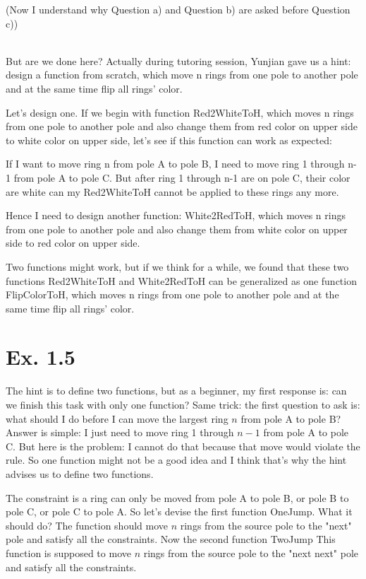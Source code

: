 \documentclass[a4paper,11pt]{article}
\theoremstyle{mytheor}
\begin{document}
(Now I understand why Question a) and Question b) are asked before Question c))

~\\
But are we done here? Actually during tutoring session, Yunjian gave us a hint: design a function from scratch, which move n rings from one pole to another pole and at the same time flip all rings' color.

Let's design one. If we begin with function Red2WhiteToH, which moves n rings from one pole to another pole and also change them from red color on upper side to white color on upper side, let's see if this function can work as expected:

If I want to move ring n from pole A to pole B, I need to move ring 1 through n-1 from pole A to pole C. But after ring 1 through n-1 are on pole C, their color are white can my Red2WhiteToH cannot be applied to these rings any more.

Hence I need to design another function: White2RedToH, which moves n rings from one pole to another pole and also change them from white color on upper side to red color on upper side.

Two functions might work, but if we think for a while, we found that these two functions Red2WhiteToH and White2RedToH can be generalized as one function FlipColorToH, which moves n rings from one pole to another pole and at the same time flip all rings' color.




\vspace{1.2in}

\section*{Ex. 1.5}
The hint is to define two functions, but as a beginner, my first response is: can we finish this task with only one function?
Same trick: the first question to ask is: what should I do before I can move the largest ring $n$ from pole A to pole B? Answer is simple: I just need to move ring 1 through $n-1$ from pole A to pole C. But here is the problem: I cannot do that because that move would violate the rule. So one function might not be a good idea and I think that's why the hint advises us to define two functions.

The constraint is a ring can only be moved from pole A to pole B, or pole B to pole C, or pole C to pole A.
So let's devise the first function OneJump. What it should do? The function should move $n$ rings from the source pole to the "next" pole and satisfy all the constraints.
Now the second function TwoJump This function is supposed to move $n$ rings from the source pole to the "next next" pole and satisfy all the constraints.
\end{document}
